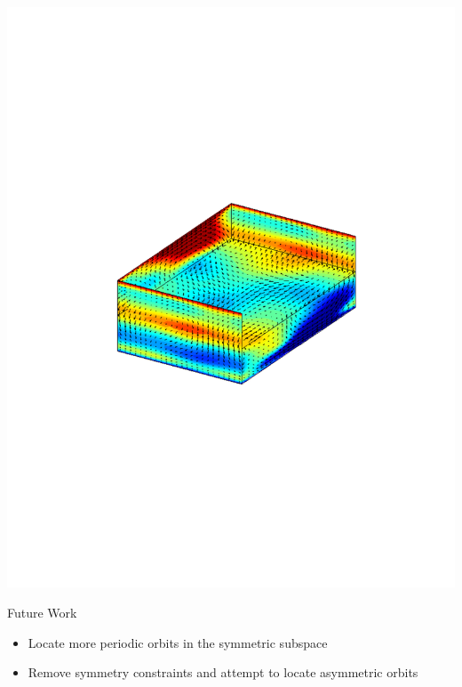 \documentclass[10pt]{beamer}
\begin{document}
\begin{frame}
\includegraphics[scale=0.4]{Data/randomfield}
\end{frame}
\begin{frame}{Future Work}
\begin{itemize}
\item<1-> Locate more periodic orbits in the symmetric subspace
\item<2-> Remove symmetry constraints and attempt to locate asymmetric orbits
\end{itemize}
\end{frame}
\end{document}
